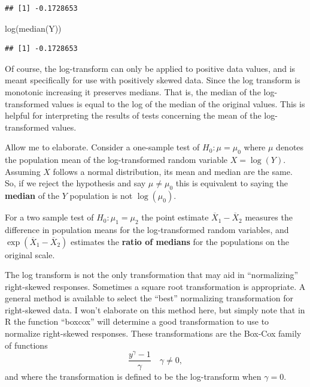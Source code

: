 \documentclass[
]{book}
\newenvironment{Shaded}{\begin{snugshade}}{\end{snugshade}}
\newcommand{\FunctionTok}[1]{\textcolor[rgb]{0.00,0.00,0.00}{#1}}
\newcommand{\NormalTok}[1]{#1}
\begin{document}
\begin{verbatim}
## [1] -0.1728653
\end{verbatim}

\begin{Shaded}
\begin{Highlighting}[]
\FunctionTok{log}\NormalTok{(}\FunctionTok{median}\NormalTok{(Y))}
\end{Highlighting}
\end{Shaded}

\begin{verbatim}
## [1] -0.1728653
\end{verbatim}

Of course, the log-transform can only be applied to positive data values, and is meant specifically for use with positively skewed data. Since the log transform is monotonic increasing it preserves medians. That is, the median of the log-transformed values is equal to the log of the median of the original values. This is helpful for interpreting the results of tests concerning the mean of the log-transformed values.

Allow me to elaborate. Consider a one-sample test of \(H_0:\mu = \mu_0\) where \(\mu\) denotes the population mean of the log-transformed random variable \(X = \log(Y)\). Assuming \(X\) follows a normal distribution, its mean and median are the same. So, if we reject the hypothesis and say \(\mu \ne \mu_0\) this is equivalent to saying the \textbf{median} of the \(Y\) population is not \(\log(\mu_0)\).

For a two sample test of \(H_0:\mu_1 = \mu_2\) the point estimate \(\overline X_1 - \overline X_2\) measures the difference in population means for the log-transformed random variables, and \(\exp(\overline X_1 - \overline X_2)\) estimates the \textbf{ratio of medians} for the populations on the original scale.

The log transform is not the only transformation that may aid in ``normalizing'' right-skewed responses. Sometimes a square root transformation is appropriate. A general method is available to select the ``best'' normalizing transformation for right-skewed data. I won't elaborate on this method here, but simply note that in R the function ``boxcox'' will determine a good transformation to use to normalize right-skewed responses. These transformations are the Box-Cox family of functions
\[\frac{y^\gamma - 1}{\gamma}\quad \gamma \ne 0, \]
and where the transformation is defined to be the log-transform when \(\gamma = 0\).
\end{document}
